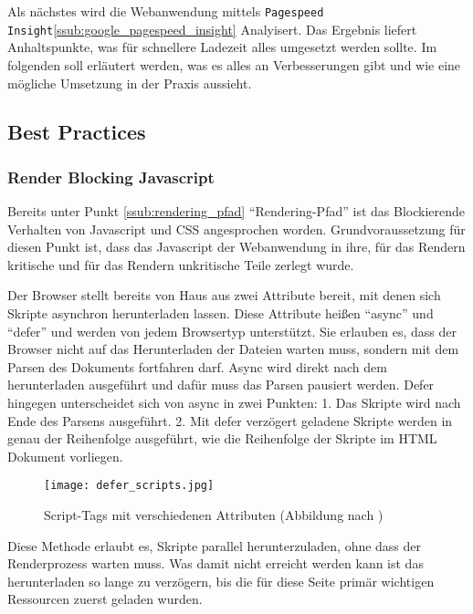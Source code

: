 		Als nächstes wird die Webanwendung mittels \texttt{Pagespeed Insight}\ref{ssub:google_pagespeed_insight} Analyisert. Das Ergebnis liefert Anhaltspunkte, was für schnellere Ladezeit alles umgesetzt werden sollte. Im folgenden soll erläutert werden, was es alles an Verbesserungen gibt und wie eine mögliche Umsetzung in der Praxis aussieht.

		\pagebreak
		
		\subsection{Best Practices}
		\label{sub:best_practices}
		
			\subsubsection{Render Blocking Javascript} %
			\label{ssub:render_blocking_javascript}
				Bereits unter Punkt \ref{ssub:rendering_pfad} "`Rendering-Pfad"' ist das Blockierende Verhalten von Javascript und CSS angesprochen worden. Grundvoraussetzung für diesen Punkt ist, dass das Javascript der Webanwendung in ihre, für das Rendern kritische und für das Rendern unkritische Teile zerlegt wurde. 

				Der Browser stellt bereits von Haus aus zwei Attribute bereit, mit denen sich Skripte asynchron herunterladen lassen. Diese Attribute heißen "`async"' und "`defer"' und werden von jedem Browsertyp unterstützt.\autocite{canIuse} Sie erlauben es, dass der Browser nicht auf das Herunterladen der Dateien warten muss, sondern mit dem Parsen des Dokuments fortfahren darf. Async wird direkt nach dem herunterladen ausgeführt und dafür muss das Parsen pausiert werden. Defer hingegen unterscheidet sich von async in zwei Punkten: 1. Das Skripte wird nach Ende des Parsens ausgeführt. 2. Mit defer verzögert geladene Skripte werden in genau der Reihenfolge ausgeführt, wie die Reihenfolge der Skripte im HTML Dokument vorliegen.
				
				\begin{figure}[htbp]
					\begin{center}
						\texttt{[image: defer\_scripts.jpg]}
						\caption{Script-Tags mit verschiedenen Attributen (Abbildung nach \autocite{growing})}
						\label{fig:defer_scripts}
					\end{center}
				\end{figure}

				Diese Methode erlaubt es, Skripte parallel herunterzuladen, ohne dass der Renderprozess warten muss. Was damit nicht erreicht werden kann ist das herunterladen so lange zu verzögern, bis die für diese Seite primär wichtigen Ressourcen zuerst geladen wurden.\\

